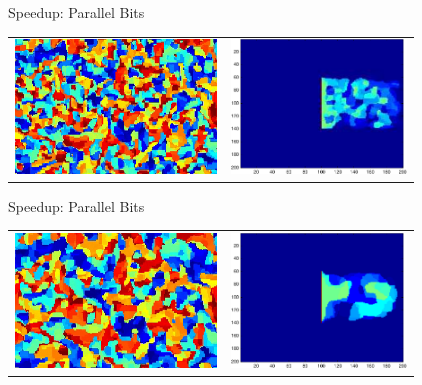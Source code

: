 \addtocounter{framenumber}{-1}
\begin{tframe}{Speedup: Parallel Bits}

\bigskip
\begin{center}
\begin{tabular}{cc}
\includegraphics[height=1.4in]{media_exploration/iso-02}&
\includegraphics[height=1.4in]{media_exploration/par025}
\end{tabular}
\end{center}
\end{tframe}

\addtocounter{framenumber}{-1}
\begin{tframe}{Speedup: Parallel Bits}

\bigskip
\begin{center}
\begin{tabular}{cc}
\includegraphics[height=1.4in]{media_exploration/iso-03}&
\includegraphics[height=1.4in]{media_exploration/par100}
\end{tabular}
\end{center}
\end{tframe}

